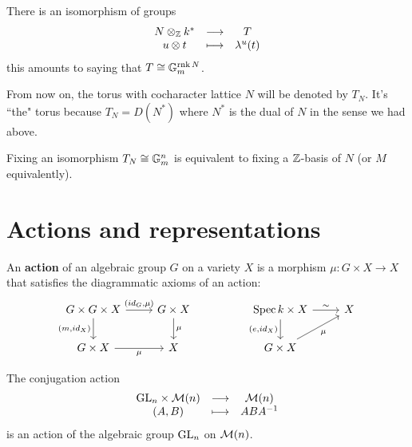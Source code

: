 \begin{remark}
There is an isomorphism of groups
\[\begin{array}{ccc} {N\otimes_{\mathbb{Z}}k^\ast} & \longrightarrow & {T}\\ {u\otimes t} & \longmapsto & {\lambda^u(t)} \end{array}\]
this amounts to saying that $T\cong \mathbb{G}_m^{\operatorname{rnk} N}$.
\end{remark}

\begin{notation}
From now on, the torus with cocharacter lattice $N$ will be denoted by $T_N$. It's ``the" torus because $T_N=D(N^\ast)$ where $N^\ast$ is the dual of $N$ in the sense we had above.
\end{notation}

\begin{remark}
Fixing an isomorphism $T_N\cong \mathbb{G}_m^n$ is equivalent to fixing a $\mathbb{Z}$-basis of $N$ (or $M$ equivalently).
\end{remark}



\section{Actions and representations}

\begin{definition}
An \textbf{action} of an algebraic group $G$ on a variety $X$ is a morphism $\mu:G\times X\to X$ that satisfies the diagrammatic axioms of an action:
\[\begin{tikzcd}
	{G\times G\times X} & {G\times X} && {\Spec k\times X} & X \\
	{G\times X} & X && {G\times X}
	\arrow["{(id_G,\mu)}", from=1-1, to=1-2]
	\arrow["{(m,id_X)}"', from=1-1, to=2-1]
	\arrow["\mu", from=1-2, to=2-2]
	\arrow["\sim", from=1-4, to=1-5]
	\arrow["{(e,id_X)}"', from=1-4, to=2-4]
	\arrow["\mu"', from=2-1, to=2-2]
	\arrow["\mu"', from=2-4, to=1-5]
\end{tikzcd}\]
\end{definition}

\begin{example}
The conjugation action 
\[\begin{array}{ccc} {\mathrm{GL}_n\times \mathcal{M}(n)} & \longrightarrow & {\mathcal{M}(n)}\\ {(A,B)} & \longmapsto & {ABA^{-1}} \end{array}\] 
is an action of the algebraic group $\mathrm{GL}_n$ on $\mathcal{M}(n)$.
\end{example}

